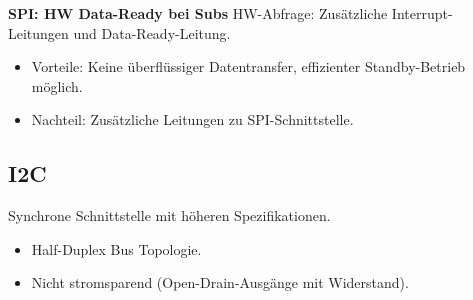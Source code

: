 \textbf{SPI: HW Data-Ready bei Subs}
HW-Abfrage: Zusätzliche Interrupt-Leitungen und Data-Ready-Leitung.
\begin{itemize}
    \item Vorteile: Keine überflüssiger Datentransfer, effizienter Standby-Betrieb möglich.
    \item Nachteil: Zusätzliche Leitungen zu SPI-Schnittstelle.
\end{itemize}

\subsection{I2C}
Synchrone Schnittstelle mit höheren Spezifikationen.
\begin{itemize}
    \item Half-Duplex Bus Topologie.
    \item Nicht stromsparend (Open-Drain-Ausgänge mit Widerstand).
\end{itemize}
